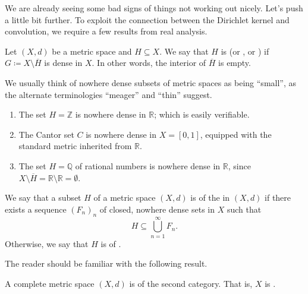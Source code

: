 \documentclass[notoc,notitlepage]{tufte-book}
\begin{document}
We are already seeing some bad signs of things not working out nicely.
Let's push a little bit further.
To exploit the connection between the Dirichlet kernel and convolution,
we require a few results from real analysis.

\begin{defn}\label{defn:nowhere_dense}
  Let $(X, d)$ be a metric space and $H \subseteq X$.
  We say that $H$ is  (or , or )
  if $G \coloneqq X \setminus \overline{H}$ is dense in $X$.
  In other words, the interior of $\overline{H}$ is empty.
\end{defn}

\begin{eg}
  We usually think of nowhere dense subsets of metric spaces as
  being ``small'', as the alternate terminologies ``meager'' and ``thin''
  suggest.
  \begin{enumerate}
    \item The set $H = \mathbb{Z}$ is nowhere dense in $\mathbb{R}$;
      which is easily verifiable.
    \item The Cantor set $C$ is nowhere dense in $X = [0, 1]$,
      equipped with the standard metric inherited from $\mathbb{R}$.
    \item The set $H = \mathbb{Q}$ of rational numbers is  
      nowhere dense in $\mathbb{R}$, since $X \setminus \overline{H} =
      \mathbb{R} \setminus \mathbb{R} = \emptyset$.
  \end{enumerate}
\end{eg}

\begin{defn}\label{defn:first_and_second_category}
  We say that a subset $H$ of a metric space $(X, d)$ is
  of the  in $(X, d)$ if there exists
  a sequence $(F_n)_n$ of closed, nowhere dense sets in $X$
  such that
  \begin{equation*}
    H \subseteq \bigcup_{n=1}^{\infty} F_n.
  \end{equation*}
  Otherwise, we say that $H$ is of .
\end{defn}

The reader should be familiar with the following result.

\begin{defn}\label{defn:baire_category_theorem}
  A complete metric space $(X, d)$ is of the second category.
  That is, $X$ is . 
\end{defn}
\end{document}

